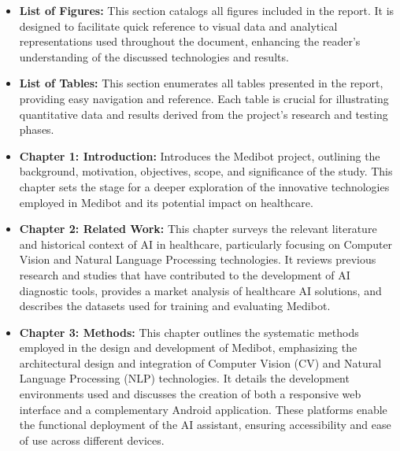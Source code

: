 \begin{itemize}
    \item \textbf{List of Figures:} This section catalogs all figures included in the report. It is designed to facilitate quick reference to visual data and analytical representations used throughout the document, enhancing the reader's understanding of the discussed technologies and results.
    
    \item \textbf{List of Tables:} This section enumerates all tables presented in the report, providing easy navigation and reference. Each table is crucial for illustrating quantitative data and results derived from the project's research and testing phases.
    
    
    \item \textbf{Chapter 1: Introduction:} Introduces the Medibot project, outlining the background, motivation, objectives, scope, and significance of the study. This chapter sets the stage for a deeper exploration of the innovative technologies employed in Medibot and its potential impact on healthcare.
    
    \item \textbf{Chapter 2: Related Work:} This chapter surveys the relevant literature and historical context of AI in healthcare, particularly focusing on Computer Vision and Natural Language Processing technologies. It reviews previous research and studies that have contributed to the development of AI diagnostic tools, provides a market analysis of healthcare AI solutions, and describes the datasets used for training and evaluating Medibot.
    
    \item \textbf{Chapter 3: Methods:} This chapter outlines the systematic methods employed in the design and development of Medibot, emphasizing the architectural design and integration of Computer Vision (CV) and Natural Language Processing (NLP) technologies. It details the development environments used and discusses the creation of both a responsive web interface and a complementary Android application. These platforms enable the functional deployment of the AI assistant, ensuring accessibility and ease of use across different devices.
    

\end{itemize}
